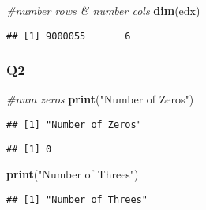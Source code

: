 \documentclass[
]{article}
\newenvironment{Shaded}{\begin{snugshade}}{\end{snugshade}}
\newcommand{\CommentTok}[1]{\textcolor[rgb]{0.56,0.35,0.01}{\textit{#1}}}
\newcommand{\DecValTok}[1]{\textcolor[rgb]{0.00,0.00,0.81}{#1}}
\newcommand{\KeywordTok}[1]{\textcolor[rgb]{0.13,0.29,0.53}{\textbf{#1}}}
\newcommand{\NormalTok}[1]{#1}
\newcommand{\OperatorTok}[1]{\textcolor[rgb]{0.81,0.36,0.00}{\textbf{#1}}}
\newcommand{\StringTok}[1]{\textcolor[rgb]{0.31,0.60,0.02}{#1}}
\begin{document}
\begin{Shaded}
\begin{Highlighting}[]
\CommentTok{#number rows & number cols}
\KeywordTok{dim}\NormalTok{(edx)}
\end{Highlighting}
\end{Shaded}

\begin{verbatim}
## [1] 9000055       6
\end{verbatim}

\hypertarget{q2}{%
\subsubsection{Q2}\label{q2}}

\begin{Shaded}
\begin{Highlighting}[]
\CommentTok{#num zeros}
\KeywordTok{print}\NormalTok{(}\StringTok{"Number of Zeros"}\NormalTok{)}
\end{Highlighting}
\end{Shaded}

\begin{verbatim}
## [1] "Number of Zeros"
\end{verbatim}

\begin{Shaded}
\end{Shaded}

\begin{verbatim}
## [1] 0
\end{verbatim}

\begin{Shaded}
\begin{Highlighting}[]
\KeywordTok{print}\NormalTok{(}\StringTok{"Number of Threes"}\NormalTok{)}
\end{Highlighting}
\end{Shaded}

\begin{verbatim}
## [1] "Number of Threes"
\end{verbatim}

\begin{Shaded}
\end{Shaded}
\end{document}
